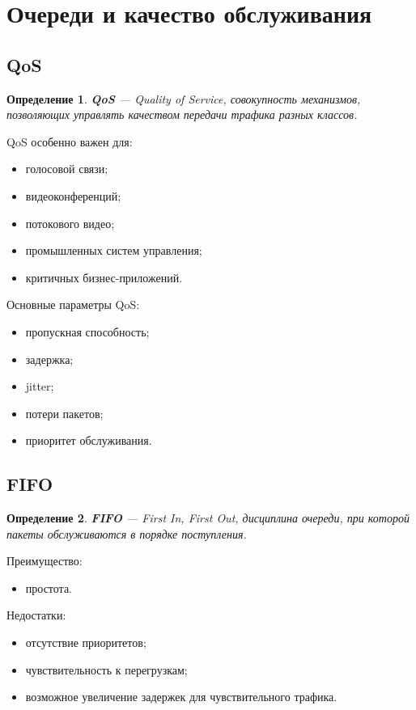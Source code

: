 \documentclass[12pt,a4paper]{article}
\newtheorem{definition}{Определение}
\begin{document}
\section{Очереди и качество обслуживания}

\subsection{QoS}

\begin{definition}
\textbf{QoS} --- Quality of Service, совокупность механизмов, позволяющих управлять качеством передачи трафика разных классов.
\end{definition}

QoS особенно важен для:
\begin{itemize}
    \item голосовой связи;
    \item видеоконференций;
    \item потокового видео;
    \item промышленных систем управления;
    \item критичных бизнес-приложений.
\end{itemize}

Основные параметры QoS:
\begin{itemize}
    \item пропускная способность;
    \item задержка;
    \item jitter;
    \item потери пакетов;
    \item приоритет обслуживания.
\end{itemize}

\subsection{FIFO}

\begin{definition}
\textbf{FIFO} --- First In, First Out, дисциплина очереди, при которой пакеты обслуживаются в порядке поступления.
\end{definition}

Преимущество:
\begin{itemize}
    \item простота.
\end{itemize}

Недостатки:
\begin{itemize}
    \item отсутствие приоритетов;
    \item чувствительность к перегрузкам;
    \item возможное увеличение задержек для чувствительного трафика.
\end{itemize}
\end{document}
